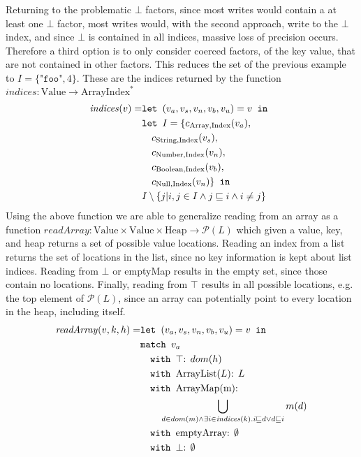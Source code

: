 Returning to the problematic $\bot$ factors, since most writes would contain a at least one $\bot$ factor, most writes would, with the second approach, write to the $\bot$ index, and since $\bot$ is contained in all indices, massive loss of precision occurs. Therefore a third option is to only consider coerced factors, of the key value, that are not contained in other factors. This reduces the set of the previous example to $I = \{\texttt{"foo"}, 4\}$. These are the indices returned by the function $\mathit{indices}: \text{Value} \rightarrow \text{ArrayIndex}^*$
\newcommand{\is}{\texttt{ is }}
\begin{align}
    \mathit{indices}(v) =    &\texttt{let } (v_a,v_s, v_n, v_b, v_u) = v \texttt{ in }\notag\\
                    & \texttt{let } I = \{ c_{\text{Array}, \text{Index}}(v_a),\notag\\
                    &\quad c_{\text{String}, \text{Index}}(v_s),\notag\\
                    &\quad c_{\text{Number}, \text{Index}}(v_n),\notag\\
                    &\quad c_{\text{Boolean}, \text{Index}}(v_b),\notag\\
                    &\quad c_{\text{Null}, \text{Index}}(v_n) \} \texttt{ in }\notag\\
                    &I \setminus \{j|i,j\in I \wedge j\sqsubseteq i \wedge i \neq j \}
\end{align}
Using the above function we are able to generalize reading from an array as a function $\mathit{readArray}: \text{Value} \times \text{Value} \times \text{Heap} \rightarrow \mathcal{P}(L)$ which given a value, key, and heap returns a set of possible value locations. Reading an index from a list returns the set of locations in the list, since no key information is kept about list indices. Reading from $\bot$ or emptyMap results in the empty set, since those contain no locations. Finally, reading from $\top$ results in all possible locations, e.g. the top element of $\mathcal{P}(L)$, since an array can potentially point to every location in the heap, including itself.
\begin{align}
\mathit{readArray}(v,k,h) =            &\texttt{let } (v_a,v_s,v_n,v_b,v_u) = v \texttt{ in }\notag\\
                            &\texttt{match }v_a\notag\\
                            &\quad\texttt{with }\top\text{: } dom(h) \notag\\
                            &\quad\texttt{with }\text{ArrayList}(L)\text{: } L \notag\\
                            &\quad\texttt{with }\text{ArrayMap(m)}\text{: } \notag\\
                            & \quad\quad \bigcup_{d \in dom(m) \wedge \exists i \in \mathit{indices}(k).i\sqsubseteq d \vee d \sqsubseteq i } m(d)\notag\\
                            &\quad\texttt{with }\text{emptyArray}\text{: } \emptyset \notag\\
                            &\quad\texttt{with }\bot\text{: } \emptyset
\end{align}

